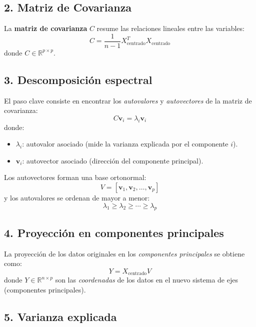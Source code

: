 \documentclass[12pt]{article}
\begin{document}
        \subsection*{2. Matriz de Covarianza}
        
        La \textbf{matriz de covarianza} $ C $ resume las relaciones lineales entre las variables:
        \[
        C = \frac{1}{n-1} X_{\text{centrado}}^T X_{\text{centrado}}
        \]
        donde $ C \in \mathbb{R}^{p \times p} $.
        
        \subsection*{3. Descomposición espectral}
        
        El paso clave consiste en encontrar los \emph{autovalores} y \emph{autovectores} de la matriz de covarianza:
        \[
        C \mathbf{v}_i = \lambda_i \mathbf{v}_i
        \]
        donde:
        \begin{itemize}
                \item $\lambda_i$: autovalor asociado (mide la varianza explicada por el componente $ i $).
                \item $\mathbf{v}_i$: autovector asociado (dirección del componente principal).
        \end{itemize}
        
        Los autovectores forman una base ortonormal:
        \[
        V = [\mathbf{v}_1, \mathbf{v}_2, \ldots, \mathbf{v}_p]
        \]
        y los autovalores se ordenan de mayor a menor:
        \[
        \lambda_1 \geq \lambda_2 \geq \cdots \geq \lambda_p
        \]
        
        \subsection*{4. Proyección en componentes principales}
        
        La proyección de los datos originales en los \emph{componentes principales} se obtiene como:
        \[
        Y = X_{\text{centrado}} V
        \]
        donde $ Y \in \mathbb{R}^{n \times p} $ son las \emph{coordenadas} de los datos en el nuevo sistema de ejes (componentes principales).
        
        \subsection*{5. Varianza explicada}
        
\end{document}
